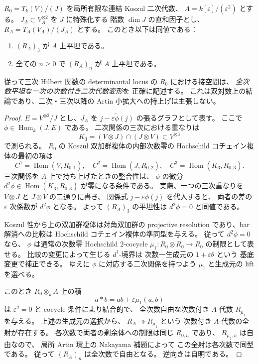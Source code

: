 \begin{lemma}
\label{lem:koszul-first-order-degree-three}
$R_0=T_k(V)/(J)$ を局所有限な連結 Koszul 二次代数、
$A=k[\varepsilon]/(\varepsilon^2)$ とする。
$J_A\subset V_A^{\otimes2}$ を $J$ に特殊化する
階数 $\dim J$ の直和因子とし、
$R_A=T_A(V_A)/(J_A)$ とする。
このとき以下は同値である：
\begin{enumerate}
\item $(R_A)_3$ が $A$ 上平坦である。
\item 全ての $n\ge0$ で $(R_A)_n$ が $A$ 上平坦である。
\end{enumerate}
従って三次 Hilbert 関数の determinantal locus の
$R_0$ における接空間は、
\emph{全次数平坦な一次の次数付き二次代数変形}を
正確に記述する。
これは双対数上の結論であり、二次・三次以降の
Artin 小拡大への持上げは主張しない。
\end{lemma}
\begin{proof}
$E=V^{\otimes2}/J$ とし、$J_A$ を
$j-\varepsilon\widetilde\phi(j)$ の張るグラフとして表す。
ここで $\phi\in\operatorname{Hom}_k(J,E)$ である。
二次関係の三次における重なりは
\[
 K_3=(V\otimes J)\cap(J\otimes V)\subset V^{\otimes3}
\]
で測られる。
$R_0$ の Koszul 双加群複体の内部次数零の
Hochschild コチェイン複体の最初の項は
\[
 C^1=\operatorname{Hom}(V,R_{0,1}),\quad
 C^2=\operatorname{Hom}(J,R_{0,2}),\quad
 C^3=\operatorname{Hom}(K_3,R_{0,3}).
 \tag{Kos-C}\label{eq:noncubic-koszul-hoch-cochain}
\]
三次関係を $A$ 上で持ち上げたときの整合性は、
$\phi$ の微分
$d^2\phi\in\operatorname{Hom}(K_3,R_{0,3})$
が零になる条件である。
実際、一つの三次重なりを
$V\otimes J$ と $J\otimes V$ の二通りに書き、
関係式 $j-\varepsilon\widetilde\phi(j)$ を代入すると、
両者の差の $\varepsilon$ 次係数が
$d^2\phi$ となる。
よって $(R_A)_3$ の平坦性は $d^2\phi=0$ と同値である。

Koszul 性から上の双加群複体は対角双加群の
projective resolution であり、bar 解消への比較は
Hochschild コチェイン複体の準同型を与える。
従って $d^2\phi=0$ なら、
$\phi$ は通常の次数零 Hochschild $2$-cocycle
$\mu_1:R_0\otimes R_0\to R_0$ の制限として表せる。
比較の変更によって生じる $d^1$-境界は
次数一生成元の $1+\varepsilon\theta$ という
基底変更で補正できる。
ゆえに $\phi$ に対応する二次関係を持つよう
$\mu_1$ と生成元の lift を選べる。

このとき $R_0\otimes_k A$ 上の積
\[
 a*b=ab+\varepsilon\mu_1(a,b)
\]
は $\varepsilon^2=0$ と cocycle 条件により結合的で、
全次数自由な次数付き $A$-代数 $R_{\mu_1}$ を与える。
上述の生成元の選択から、
$R_A\twoheadrightarrow R_{\mu_1}$ という
次数付き $A$-代数の全射が存在する。
各次数で両者の剰余体への制限は同じ $R_{0,n}$ であり、
$R_{\mu_1,n}$ は自由なので、
局所 Artin 環上の Nakayama 補題によって
この全射は各次数で同型である。
従って $(R_A)_n$ は全次数で自由となる。
逆向きは自明である。
\end{proof}

